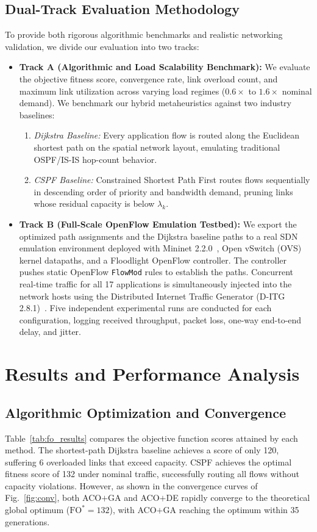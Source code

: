 \documentclass[journal]{IEEEtran}
\newcommand{\FO}{\mathrm{FO}}
\begin{document}
\subsection{Dual-Track Evaluation Methodology}
To provide both rigorous algorithmic benchmarks and realistic networking validation, we divide our evaluation into two tracks:
\begin{itemize}
    \item \textbf{Track A (Algorithmic and Load Scalability Benchmark):} We evaluate the objective fitness score, convergence rate, link overload count, and maximum link utilization across varying load regimes ($0.6\times$ to $1.6\times$ nominal demand). We benchmark our hybrid metaheuristics against two industry baselines:
    \begin{enumerate}
        \item \emph{Dijkstra Baseline:} Every application flow is routed along the Euclidean shortest path on the spatial network layout, emulating traditional OSPF/IS-IS hop-count behavior.
        \item \emph{CSPF Baseline:} Constrained Shortest Path First routes flows sequentially in descending order of priority and bandwidth demand, pruning links whose residual capacity is below $\lambda_k$.
    \end{enumerate}
    \item \textbf{Track B (Full-Scale OpenFlow Emulation Testbed):} We export the optimized path assignments and the Dijkstra baseline paths to a real SDN emulation environment deployed with Mininet 2.2.0~\cite{lantz2010network}, Open vSwitch (OVS) kernel datapaths, and a Floodlight OpenFlow controller. The controller pushes static OpenFlow \texttt{FlowMod} rules to establish the paths. Concurrent real-time traffic for all 17 applications is simultaneously injected into the network hosts using the Distributed Internet Traffic Generator (D-ITG 2.8.1)~\cite{botta2012itg}. Five independent experimental runs are conducted for each configuration, logging received throughput, packet loss, one-way end-to-end delay, and jitter.
\end{itemize}

\section{Results and Performance Analysis}
\label{sec:results}

\subsection{Algorithmic Optimization and Convergence}
Table~\ref{tab:fo_results} compares the objective function scores attained by each method. The shortest-path Dijkstra baseline achieves a score of only 120, suffering 6 overloaded links that exceed capacity. CSPF achieves the optimal fitness score of 132 under nominal traffic, successfully routing all flows without capacity violations. However, as shown in the convergence curves of Fig.~\ref{fig:conv}, both ACO$+$GA and ACO$+$DE rapidly converge to the theoretical global optimum ($\FO^* = 132$), with ACO$+$GA reaching the optimum within 35 generations.
\end{document}

